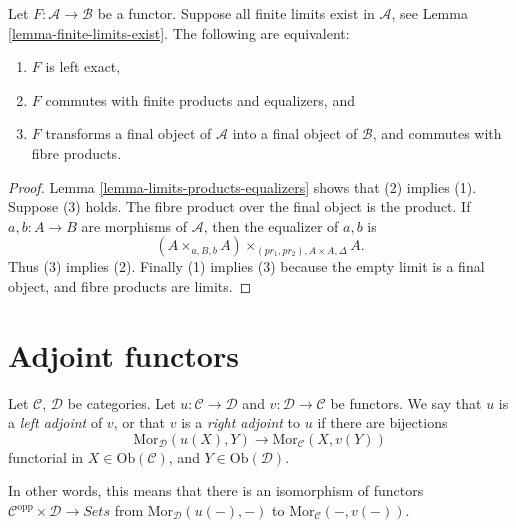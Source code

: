 \begin{lemma}
\label{lemma-characterize-left-exact}
Let $F : \mathcal{A} \to \mathcal{B}$ be a functor.
Suppose all finite limits exist in $\mathcal{A}$,
see Lemma \ref{lemma-finite-limits-exist}.
The following are equivalent:
\begin{enumerate}
\item $F$ is left exact,
\item $F$ commutes with finite products and equalizers, and
\item $F$ transforms a final object of $\mathcal{A}$
into a final object of $\mathcal{B}$, and commutes with fibre products.
\end{enumerate}
\end{lemma}

\begin{proof}
Lemma \ref{lemma-limits-products-equalizers} shows that (2) implies (1).
Suppose (3) holds. The fibre product over the final object is the product.
If $a, b : A \to B$ are morphisms of $\mathcal{A}$, then the
equalizer of $a, b$ is
$$
(A \times_{a, B, b} A)\times_{(pr_1, pr_2), A \times A, \Delta} A.
$$
Thus (3) implies (2). Finally (1) implies (3) because
the empty limit is a final object, and fibre products are limits.
\end{proof}


\section{Adjoint functors}
\label{section-adjoint}

\begin{definition}
\label{definition-adjoint}
Let $\mathcal{C}$, $\mathcal{D}$ be categories.
Let $u : \mathcal{C} \to \mathcal{D}$ and
$v : \mathcal{D} \to \mathcal{C}$ be functors.
We say that $u$ is a {\it left adjoint} of $v$, or that
$v$ is a {\it right adjoint} to $u$ if there are bijections
$$
\text{Mor}_{\mathcal{D}}(u(X), Y)
\longrightarrow
\text{Mor}_{\mathcal{C}}(X, v(Y))
$$
functorial in $X \in \text{Ob}(\mathcal{C})$, and
$Y \in \text{Ob}(\mathcal{D})$.
\end{definition}

\noindent
In other words, this means that there is an isomorphism
of functors $\mathcal{C}^{\text{opp}} \times \mathcal{D}
\to \textit{Sets}$ from $\text{Mor}_{\mathcal{D}}(u(-), -)$
to $\text{Mor}_{\mathcal{C}}(-, v(-))$.

